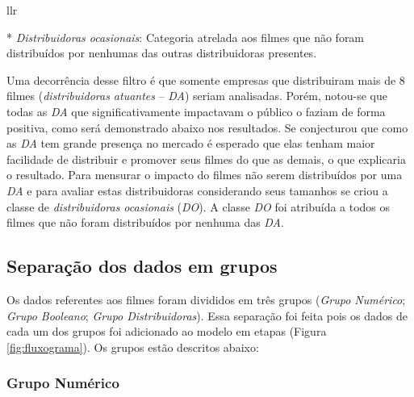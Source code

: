 \documentclass[11pt,a4paper]{article}
\begin{document}
\begin{table}
\begin{threeparttable}
\begin{tabular}{ {l}{l}{r}}
 
 
 
\hline
\end{tabular}

\begin{tablenotes}
\item[*] \textit{Distribuidoras ocasionais}: Categoria atrelada aos filmes que não foram distribuídos por nenhumas das outras distribuidoras presentes.
\end{tablenotes}
\end{threeparttable}

\caption{Variáveis booleanas consideradas no estudo}

\label{table:booleanas}


\end{table}

Uma decorrência desse filtro é que somente empresas que distribuiram mais de 8 filmes (\textit{distribuidoras atuantes} -- \textit{DA}) seriam analisadas. Porém, notou-se que todas as \textit{DA} que significativamente impactavam o público o faziam de forma positiva, como será demonstrado abaixo nos resultados. Se conjecturou que como as \textit{DA} tem grande presença no mercado é esperado que elas tenham maior facilidade de distribuir e promover seus filmes do que as demais, o que explicaria o resultado. Para mensurar o impacto do filmes não serem distribuídos por uma \textit{DA} e para avaliar estas distribuidoras considerando seus tamanhos se criou a classe de \textit{distribuidoras ocasionais} (\textit{DO}). A classe \textit{DO} foi atribuída a todos os filmes que não foram distribuídos por nenhuma das \textit{DA}.

\subsection{Separação dos dados em grupos}

Os dados referentes aos filmes foram divididos em três grupos (\textit{Grupo Numérico}; \textit{Grupo Booleano}; \textit{Grupo Distribuidoras}). Essa separação foi feita pois os dados de cada um dos grupos foi adicionado ao modelo em etapas (Figura \ref{fig:fluxograma}). Os grupos estão descritos abaixo: 

\subsubsection{Grupo Numérico}

\end{document}
